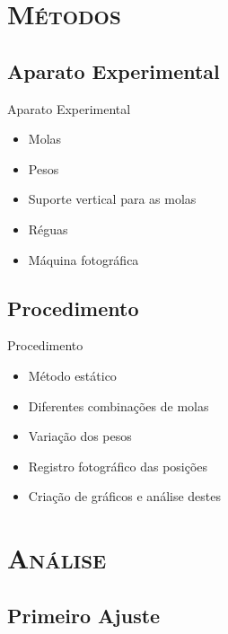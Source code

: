 \documentclass[xcolor=x11names,compress]{beamer}
\renewcommand{\(}{\begin{columns}}
\renewcommand{\)}{\end{columns}}
\newcommand{\<}[1]{\begin{column}{#1}}
\renewcommand{\>}{\end{column}}
\begin{document}

\section{\scshape Métodos}


\subsection{Aparato Experimental}

\begin{frame}{Aparato Experimental}
    \begin{itemize}
        \item Molas
        \item Pesos
        \item Suporte vertical para as molas
        \item Réguas
        \item Máquina fotográfica
    \end{itemize}
\end{frame}



\subsection{Procedimento}

\begin{frame}{Procedimento}
    \begin{itemize}
        \item Método estático
        \item Diferentes combinações de molas
        \item Variação dos pesos
        \item Registro fotográfico das posições
        \item Criação de gráficos e análise destes
    \end{itemize}
\end{frame}


\section{\scshape Análise}


\subsection{Primeiro Ajuste}
\end{document}
